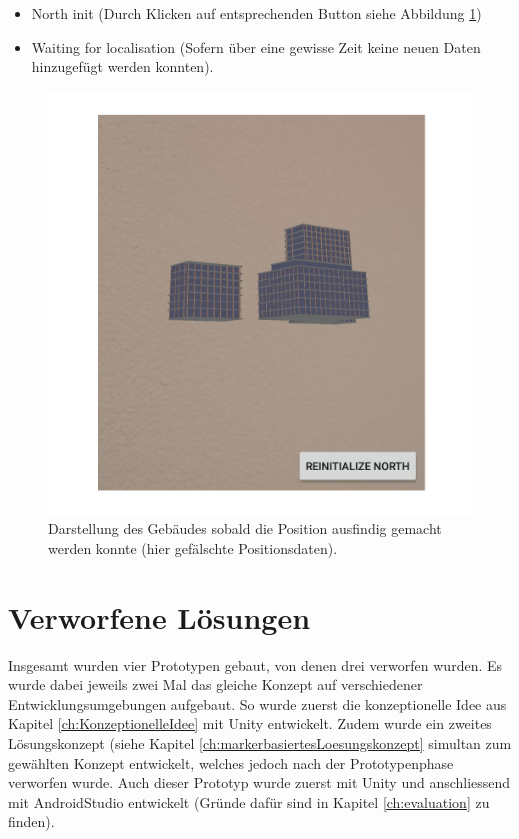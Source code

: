 \documentclass[a4paper]{scrreprt}
\begin{document}
\begin{itemize}
	\item North init (Durch Klicken auf entsprechenden Button siehe Abbildung \ref{fig:ARShowBuilding})
	\item Waiting for localisation (Sofern über eine gewisse Zeit keine neuen Daten hinzugefügt werden konnten).
\end{itemize}

\begin{figure}[h!]
	\includegraphics[keepaspectratio, width=\textwidth]{ARShowBuilding.png}
	\caption{Darstellung des Gebäudes sobald die Position ausfindig gemacht werden konnte (hier gefälschte Positionsdaten).}
    \label{fig:ARShowBuilding}
\end{figure}

\clearpage

\section{Verworfene Lösungen}
Insgesamt wurden vier Prototypen gebaut, von denen drei verworfen wurden.
Es wurde dabei jeweils zwei Mal das gleiche Konzept auf verschiedener Entwicklungsumgebungen aufgebaut. So wurde zuerst die konzeptionelle Idee aus Kapitel \ref{ch:KonzeptionelleIdee} mit Unity entwickelt. Zudem wurde ein zweites Lösungskonzept (siehe Kapitel \ref{ch:markerbasiertesLoesungskonzept} simultan zum gewählten Konzept entwickelt, welches jedoch nach der Prototypenphase verworfen wurde. Auch dieser Prototyp wurde zuerst mit Unity und anschliessend mit AndroidStudio entwickelt (Gründe dafür sind in Kapitel \ref{ch:evaluation} zu finden).
\end{document}
